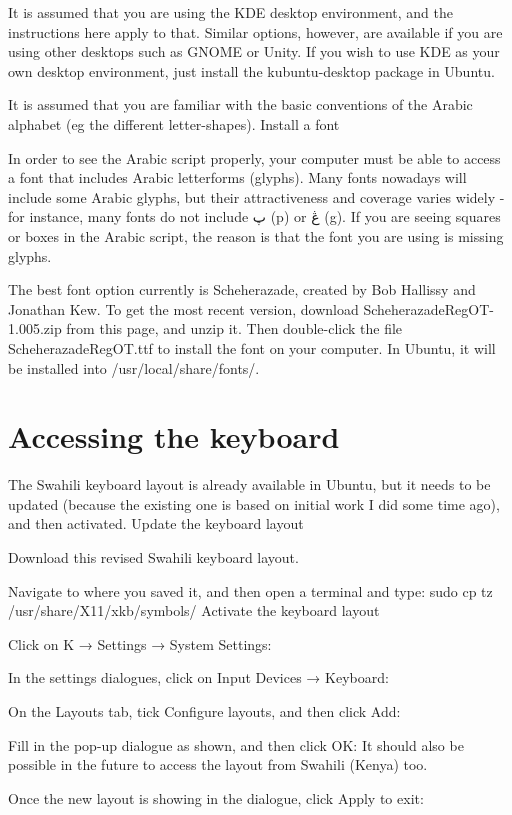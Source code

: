 \documentclass[a4paper,10pt]{article}
\newcommand{\AS}[1]{\fontspec[Script=Arabic, Scale=1.5]{Scheherazade} #1\normalfont} %
\begin{document}
It is assumed that you are using the KDE desktop environment, and the instructions here apply to that. Similar options, however, are available if you are using other desktops such as GNOME or Unity. If you wish to use KDE as your own desktop environment, just install the kubuntu-desktop package in Ubuntu.

It is assumed that you are familiar with the basic conventions of the Arabic alphabet (eg the different letter-shapes).
Install a font

In order to see the Arabic script properly, your computer must be able to access a font that includes Arabic letterforms (glyphs). Many fonts nowadays will include some Arabic glyphs, but their attractiveness and coverage varies widely - for instance, many fonts do not include \AS{پ} (p) or \AS{ڠ} (g). If you are seeing squares or boxes in the Arabic script, the reason is that the font you are using is missing glyphs.

The best font option currently is Scheherazade, created by Bob Hallissy and Jonathan Kew. To get the most recent version, download ScheherazadeRegOT-1.005.zip from this page, and unzip it. Then double-click the file ScheherazadeRegOT.ttf to install the font on your computer. In Ubuntu, it will be installed into /usr/local/share/fonts/.


\section{Accessing the keyboard}

The Swahili keyboard layout is already available in Ubuntu, but it needs to be updated (because the existing one is based on initial work I did some time ago), and then activated.
Update the keyboard layout

Download this revised Swahili keyboard layout.

Navigate to where you saved it, and then open a terminal and type:
sudo cp tz /usr/share/X11/xkb/symbols/
Activate the keyboard layout

Click on K → Settings → System Settings:

In the settings dialogues, click on Input Devices → Keyboard:

On the Layouts tab, tick Configure layouts, and then click Add:

Fill in the pop-up dialogue as shown, and then click OK:
It should also be possible in the future to access the layout from Swahili (Kenya) too.

Once the new layout is showing in the dialogue, click Apply to exit:
\end{document}
